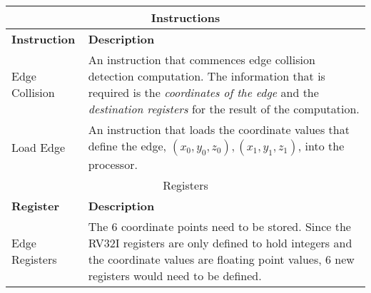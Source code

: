 \begin{table} [H]
\begin{center}
\begin{tabular}{|p{}|p{}|}
\hline
\multicolumn{2}{|c|}{Instructions} \\
\hline
\textbf{Instruction} & \textbf{Description} \\
\hline
Edge Collision  & An instruction that commences edge collision detection computation. The information that is required is the \textit{coordinates of the edge} and the \textit{destination registers} for the result of the computation. \\
\hline
Load Edge & An instruction that loads the coordinate values that define the edge, $(x_0, y_0, z_0), (x_1, y_1, z_1)$, into the processor.\\
\hline
\multicolumn{2}{|c|}{Registers} \\
\hline
\textbf{Register} & \textbf{Description} \\
\hline
Edge Registers & The 6 coordinate points need to be stored. Since the RV32I registers are only defined to hold integers and the coordinate values are floating point values, 6 new registers would need to be defined.\\
\hline
\end{tabular}
\label{table:xedgcol_specs}
\end{center}
\end{table}